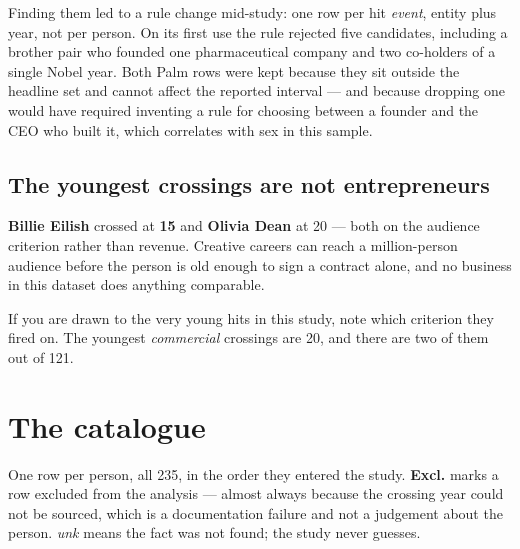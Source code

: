 \documentclass[11pt]{article}
\begin{document}
Finding them led to a rule change mid-study: one row per hit \emph{event},
entity plus year, not per person. On its first use the rule rejected five
candidates, including a brother pair who founded one pharmaceutical company and
two co-holders of a single Nobel year. Both Palm rows were kept because they sit
outside the headline set and cannot affect the reported interval --- and because
dropping one would have required inventing a rule for choosing between a founder
and the CEO who built it, which correlates with sex in this sample.

\subsection*{The youngest crossings are not entrepreneurs}

\textbf{Billie Eilish} crossed at \textbf{15} and \textbf{Olivia Dean} at 20 ---
both on the audience criterion rather than revenue. Creative careers can reach a
million-person audience before the person is old enough to sign a contract
alone, and no business in this dataset does anything comparable.

If you are drawn to the very young hits in this study, note which criterion they
fired on. The youngest \emph{commercial} crossings are 20, and there are two of
them out of 121.

\section{The catalogue}
One row per person, all 235, in the order they entered the study. \textbf{Excl.} marks a row excluded from the analysis --- almost always because the crossing year could not be sourced, which is a documentation failure and not a judgement about the person. \emph{unk} means the fact was not found; the study never guesses.
\end{document}

